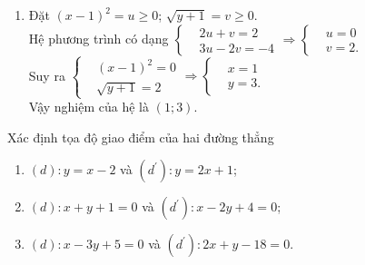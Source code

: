 \begin{bt}
{\begin{enumerate}
	Suy ra $\left\{\begin{aligned}&\dfrac{x}{x+1}=2\\&\dfrac{1}{y+4}=-1\end{aligned} \right. \Rightarrow \left\{\begin{aligned}&x=-2\\&y=-5.\end{aligned} \right.$ \\
	Vậy nghiệm của hệ là $(-2;-5)$.
	\item Đặt $(x-1)^2=u \geq 0$; $\sqrt{y+1}=v \geq 0$.\\
	Hệ phương trình có dạng $\left\{\begin{aligned}&2 u+v=2\\&3 u-2 v=-4\end{aligned} \right. \Rightarrow \left\{\begin{aligned}&u=0\\&v=2.\end{aligned} \right.$ \\
	Suy ra $\left\{\begin{aligned}&(x-1)^2=0\\&\sqrt{y+1}=2\end{aligned} \right. \Rightarrow \left\{\begin{aligned}&x=1\\&y=3.\end{aligned} \right.$ \\
	Vậy nghiệm của hệ là $(1;3)$.
	\end{enumerate}	
	}
\end{bt}
\begin{bt}%
	Xác định tọa độ giao điểm của hai đường thẳng
	\begin{enumerate}
	\item $(d): y = x - 2$ và $\left(d^{\prime}\right) : y = 2x + 1$;
	\item $(d): x + y + 1 = 0$ và $\left(d^{\prime}\right) : x - 2y + 4 = 0$;
	\item $(d): x - 3y + 5 = 0$ và $\left(d^{\prime}\right) : 2x + y - 18 = 0$.
	\end{enumerate}	
\end{bt}
